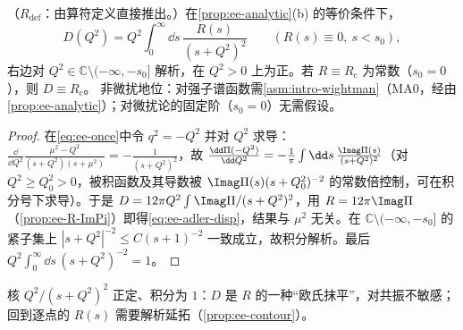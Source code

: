 \begin{proposition}\label{prop:ee-adler-dispersion}
（$R_{\mathrm{def}}$：由算符定义直接推出。）在\cref{prop:ee-analytic}(b) 的等价条件下，
\begin{equation}\label{eq:ee-adler-disp}
D(Q^2)=Q^2\int_0^\infty\!\dd s\,\frac{R(s)}{(s+Q^2)^2}\qquad(R(s)\equiv0,\ s<s_0),
\end{equation}
右边对 $Q^2\in\mathbb C\setminus(-\infty,-s_0]$ 解析，在 $Q^2>0$ 上为正。若 $R\equiv R_c$ 为常数（$s_0=0$），则 $D\equiv R_c$。
非微扰地位：对强子谱函数需\cref{asm:intro-wightman}（MA0，经由\cref{prop:ee-analytic}）；对微扰论的固定阶（$s_0=0$）无需假设。
\end{proposition}
\begin{proof}
在\cref{eq:ee-once}中令 $q^2=-Q^2$ 并对 $Q^2$ 求导：$\frac{\dd}{\dd Q^2}\frac{\mu^2-Q^2}{(s+Q^2)(s+\mu^2)}=-\frac{1}{(s+Q^2)^2}$，故 $\frac{\dd\Pi(-Q^2)}{\dd Q^2}=-\frac1\pi\int\dd s\,\frac{\Imag\Pi(s)}{(s+Q^2)^2}$（对 $Q^2\ge Q_0^2>0$，被积函数及其导数被 $\Imag\Pi(s)(s+Q_0^2)^{-2}$ 的常数倍控制，可在积分号下求导）。于是 $D=12\pi Q^2\int\Imag\Pi/(s+Q^2)^2$，用 $R=12\pi\Imag\Pi$（\cref{prop:ee-R-ImPi}）即得\cref{eq:ee-adler-disp}，结果与 $\mu^2$ 无关。在 $\mathbb C\setminus(-\infty,-s_0]$ 的紧子集上 $|s+Q^2|^{-2}\le C(s+1)^{-2}$ 一致成立，故积分解析。最后 $Q^2\int_0^\infty\dd s\,(s+Q^2)^{-2}=1$。
\end{proof}
核 $Q^2/(s+Q^2)^2$ 正定、积分为 $1$：$D$ 是 $R$ 的一种“欧氏抹平”，对共振不敏感；回到逐点的 $R(s)$ 需要解析延拓（\cref{prop:ee-contour}）。
